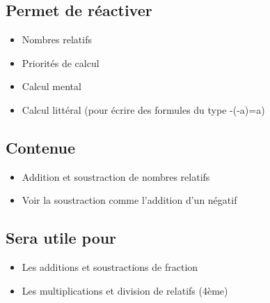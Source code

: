 
\subsection{Permet de réactiver}
\begin{itemize}
    \item Nombres relatifs
    \item Priorités de calcul
    \item Calcul mental
    \item Calcul littéral (pour écrire des formules du type -(-a)=a)
\end{itemize}

\subsection{Contenue}
\begin{itemize}
    \item Addition et soustraction de nombres relatifs
    \item Voir la soustraction comme l'addition d'un négatif
\end{itemize}

\subsection{Sera utile pour}
\begin{itemize}
    \item Les additions et soustractions de fraction
    \item Les multiplications et division de relatifs (4ème)
\end{itemize}